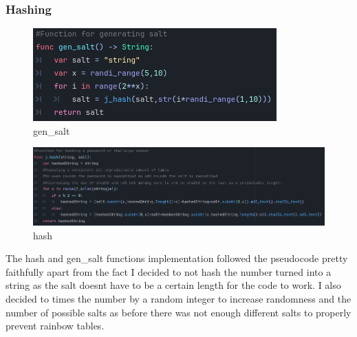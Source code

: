 \documentclass{article}
\begin{document}
        \subsubsection{Hashing}
        \begin{figure}[H]
                \centering
                \includegraphics{images/development/gen_salt.PNG}
                \caption{gen\_salt}
        \end{figure}
        \begin{figure}[H]
                \centering
                \includegraphics[width = \columnwidth]{images/development/hash.PNG}
                \caption{hash}
        \end{figure}
        \[\]
        The hash and gen\_salt functions implementation followed the pseudocode pretty faithfully apart from the fact I decided to not hash the number turned into a string as the salt doesnt have to be a certain length for the code to work. I also decided to times the number by a random integer to increase randomness and the number of possible salts as before there was not enough different salts to properly prevent rainbow tables.\\
\end{document}
